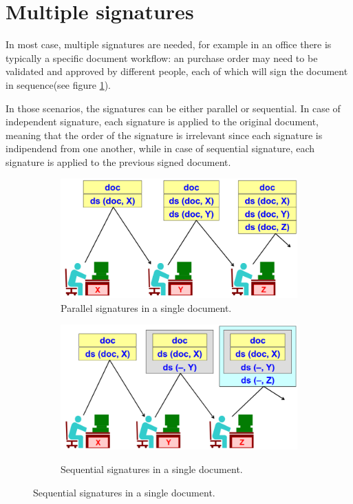 \section{Multiple signatures}
In most case, multiple signatures are needed, for example in an office
there is typically a specific document workflow: an purchase order 
may need to be validated and approved by different people, each of 
which will sign the document in sequence(see figure \ref{fig:parrallel signatures}). 

In those scenarios, the signatures can be either parallel or
sequential. In case of independent signature, each signature is applied
to the original document, meaning that the order of the signature is
irrelevant since each signature is indipendend from one another, while
in case of sequential signature, each signature is applied to the
previous signed document.
\begin{figure}[H]
  \centering
  \begin{subfigure}[b]{0.45\textwidth}
    \includegraphics[width=\textwidth]{img/paralledl signatures.png}
    \caption{Parallel signatures in a single document.}
    \label{fig:parrallel signatures}
  \end{subfigure}
  \hfill
  \begin{subfigure}[b]{0.45\textwidth}
    \includegraphics[width=\textwidth]{img/sequential signatures.png}
    \label{fig:sequential signatures}
    \caption{Sequential signatures in a single document.}
  \end{subfigure}
\end{figure}

